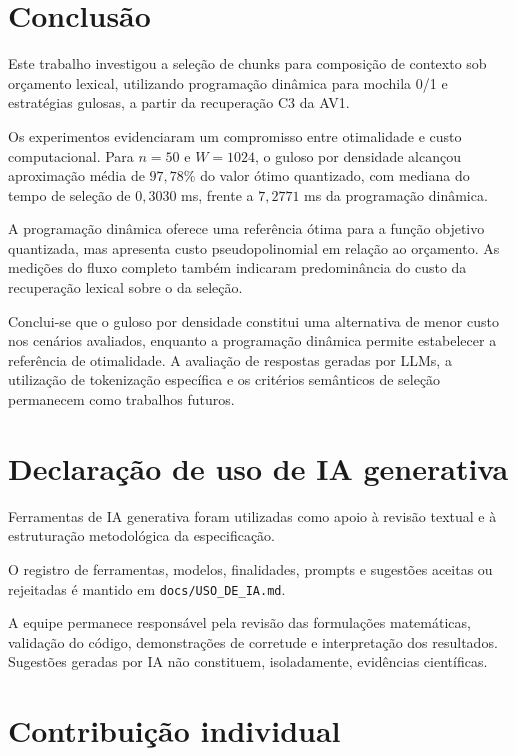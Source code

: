 \documentclass[11pt,a4paper]{article}
\theoremstyle{plain}
\theoremstyle{definition}
\theoremstyle{plain}
\begin{document}
\section{Conclusão}

Este trabalho investigou a seleção de chunks
para composição de contexto sob orçamento
lexical, utilizando programação dinâmica
para mochila 0/1 e estratégias gulosas,
a partir da recuperação C3 da AV1.

Os experimentos evidenciaram um compromisso
entre otimalidade e custo computacional.
Para $n=50$ e $W=1024$, o guloso por
densidade alcançou aproximação média de
$97{,}78\%$ do valor ótimo quantizado,
com mediana do tempo de seleção de $0{,}3030$ ms,
frente a $7{,}2771$ ms da programação
dinâmica.

A programação dinâmica oferece uma
referência ótima para a função objetivo
quantizada, mas apresenta custo
pseudopolinomial em relação ao orçamento.
As medições do fluxo completo também
indicaram predominância do custo da
recuperação lexical sobre o da seleção.

Conclui-se que o guloso por densidade
constitui uma alternativa de menor custo
nos cenários avaliados, enquanto a
programação dinâmica permite estabelecer
a referência de otimalidade.
A avaliação de respostas geradas por LLMs,
a utilização de tokenização específica
e os critérios semânticos de seleção
permanecem como trabalhos futuros.


\section{Declaração de uso de IA generativa}

Ferramentas de IA generativa foram utilizadas
como apoio à revisão textual e à estruturação
metodológica da especificação.

O registro de ferramentas, modelos, finalidades,
prompts e sugestões aceitas ou rejeitadas
é mantido em \texttt{docs/USO\_DE\_IA.md}.

A equipe permanece responsável pela revisão
das formulações matemáticas, validação do
código, demonstrações de corretude e
interpretação dos resultados. Sugestões
geradas por IA não constituem, isoladamente,
evidências científicas.


\section{Contribuição individual}
\label{sec:contrib}
\end{document}
